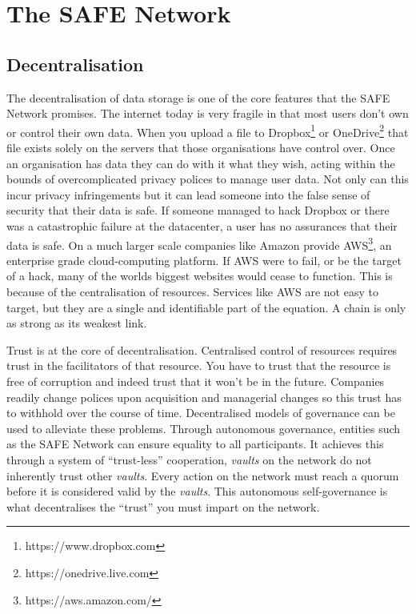 \chapter{The SAFE Network}
\label{ch:thesafenetwork}

\section{Decentralisation}

The decentralisation of data storage is one of the core features that the SAFE Network promises. The internet today is very fragile in that most users don't own or control their own data. When you upload a file to Dropbox\footnote{https://www.dropbox.com} or OneDrive\footnote{https://onedrive.live.com} that file exists solely on the servers that those organisations have control over. Once an organisation has data they can do with it what they wish, acting within the bounds of overcomplicated privacy polices to manage user data. Not only can this incur privacy infringements but it can lead someone into the false sense of security that their data is safe. If someone managed to hack Dropbox or there was a catastrophic failure at the datacenter, a user has no assurances that their data is safe. On a much larger scale companies like Amazon provide AWS\footnote{https://aws.amazon.com/}, an enterprise grade cloud-computing platform. If AWS were to fail, or be the target of a hack, many of the worlds biggest websites would cease to function. This is because of the centralisation of resources. Services like AWS are not easy to target, but they are a single and identifiable part of the equation. A chain is only as strong as its weakest link. 

Trust is at the core of decentralisation. Centralised control of resources requires trust in the facilitators of that resource. You have to trust that the resource is free of corruption and indeed trust that it won't be in the future. Companies readily change polices upon acquisition and managerial changes so this trust has to withhold over the course of time. Decentralised models of governance can be used to alleviate these problems. Through autonomous governance, entities such as the SAFE Network can ensure equality to all participants. It achieves this through a system of ``trust-less'' cooperation, \textit{vaults} on the network do not inherently trust other \textit{vaults}. Every action on the network must reach a quorum before it is considered valid by the \textit{vaults}. This autonomous self-governance is what decentralises the ``trust'' you must impart on the network.

